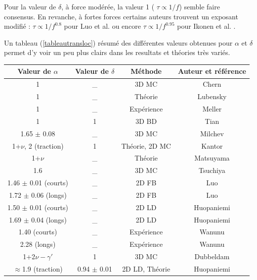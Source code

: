 Pour la valeur de $\delta$, à force modérée, la valeur 1 ( $\tau \propto 1/f$) semble faire consensus. En revanche, à fortes forces certains auteurs trouvent un exposant modifié : $\tau \propto 1/f^{0.8}$ pour Luo et al. \cite{Luo2009} ou encore $\tau \propto 1/f^{0.95}$ pour Ikonen et al. \cite{2Ikonen2012}.

 Un tableau (\ref{tableautransloc}) résumé des différentes valeurs obtenues pour $\alpha$ et $\delta$ permet d'y voir un peu plus clairs dans les resultats et théories très variés.



\begin{table}
\begin{center}


\begin{tabular}{|c|c|c|c|}
  \hline
  Valeur de $\alpha$ & Valeur de $\delta$ & Méthode & Auteur et référence \\
  \hline
  1 & \_ & 3D MC & Chern \cite{Chern2001}\\
  1 & \_  & Théorie & Lubensky \cite{Lubensky1999} \\
  1 & \_  & Expérience & Meller \cite{Meller2002} \\
  1 & 1  & 3D BD & Tian \cite{Tian2003} \\   
  1.65 $\pm$ 0.08 & \_  & 3D MC & Milchev \cite{Milchev2004} \\
  1+$\nu$, 2 (traction) & 1  & Théorie, 2D MC & Kantor \cite{Kantor2004} \\
  1+$\nu$ & \_  & Théorie & Matsuyama \cite{Matsuyama2004} \\
  1.6 & \_  & 3D MC & Tsuchiya \cite{Tsuchiya2007} \\
  1.46 $\pm$ 0.01 (courts) & \_  & 2D FB & Luo \cite{Luo2006} \\
  1.72 $\pm$ 0.06 (longs) & \_  & 2D FB & Luo \cite{Luo2006} \\
  1.50 $\pm$ 0.01 (courts) & \_  & 2D LD & Huopaniemi \cite{Huopaniemi2006} \\
  1.69 $\pm$ 0.04 (longs) & \_  & 2D LD & Huopaniemi \cite{Huopaniemi2006} \\
   1.40 (courts) & \_  & Expérience & Wanunu \cite{Wanunu2008} \\
  2.28 (longs) & \_  & Expérience & Wanunu \cite{Wanunu2008} \\
  1+2$\nu-\gamma'$ & 1  & 3D MC & Dubbeldam \cite{Dubbeldam2007} \\
  $\approx$1.9 (traction) & 0.94 $\pm$ 0.01  & 2D LD, Théorie & Huopaniemi \cite{Huopaniemi2007} \\

\end{tabular}
\end{center}
\end{table}
